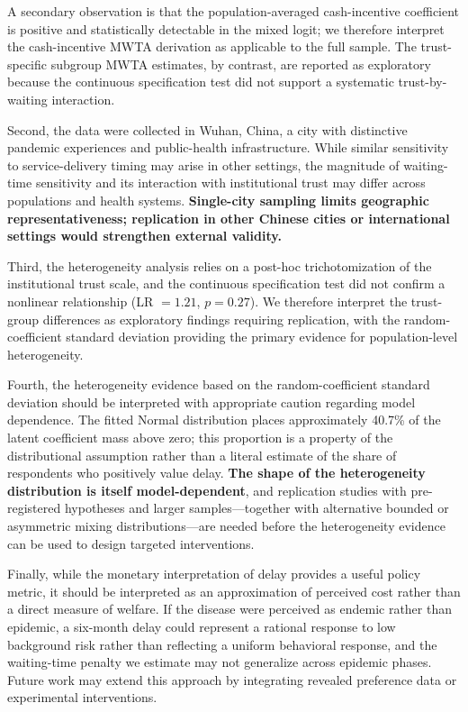 \documentclass[12pt]{article}
\begin{document}
A secondary observation is that the population-averaged cash-incentive coefficient is positive and statistically detectable in the mixed logit; we therefore interpret the cash-incentive MWTA derivation as applicable to the full sample. The trust-specific subgroup MWTA estimates, by contrast, are reported as exploratory because the continuous specification test did not support a systematic trust-by-waiting interaction.

Second, the data were collected in Wuhan, China, a city with distinctive pandemic experiences and public-health infrastructure. While similar sensitivity to service-delivery timing may arise in other settings, the magnitude of waiting-time sensitivity and its interaction with institutional trust may differ across populations and health systems. \textbf{Single-city sampling limits geographic representativeness; replication in other Chinese cities or international settings would strengthen external validity.}

Third, the heterogeneity analysis relies on a post-hoc trichotomization of the institutional trust scale, and the continuous specification test did not confirm a nonlinear relationship (LR $= 1.21$, $p = 0.27$). We therefore interpret the trust-group differences as exploratory findings requiring replication, with the random-coefficient standard deviation providing the primary evidence for population-level heterogeneity.

Fourth, the heterogeneity evidence based on the random-coefficient standard deviation should be interpreted with appropriate caution regarding model dependence. The fitted Normal distribution places approximately 40.7\% of the latent coefficient mass above zero; this proportion is a property of the distributional assumption rather than a literal estimate of the share of respondents who positively value delay. \textbf{The shape of the heterogeneity distribution is itself model-dependent}, and replication studies with pre-registered hypotheses and larger samples---together with alternative bounded or asymmetric mixing distributions---are needed before the heterogeneity evidence can be used to design targeted interventions.

Finally, while the monetary interpretation of delay provides a useful policy metric, it should be interpreted as an approximation of perceived cost rather than a direct measure of welfare. If the disease were perceived as endemic rather than epidemic, a six-month delay could represent a rational response to low background risk rather than reflecting a uniform behavioral response, and the waiting-time penalty we estimate may not generalize across epidemic phases. Future work may extend this approach by integrating revealed preference data or experimental interventions.
\end{document}
